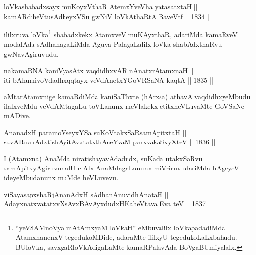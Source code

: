 
\begin{shl}
loVkashabadxsayx muKoyxV\s thaR AtemxYveVha yatasatxtaH || \\
kamARdiheVtusAdheyxVSu gwNiV loVkAthaRtA BaveVtf \hfill || 1834 ||  
\end{shl}

\begin{artha}
ililxruva loVka\footnote[1]{``yeVSAMnoV\s ya mAtAmxyaM loVkaH'' eMbuvalilx loVkapadadiMda
AtamxnanenxV tegedukoMDide, adaraMte ililxyU tegedukoLaLxbahudu. BUloVka, savxgaRloVkAdigaLaMte kamaRPalavAda BoVgaBUmiyalalx.} shabadxkekx AtamxveV muKAyxthaR, adariMda kamaRveV modalAda sAdhanagaLiMda Aguva PalagaLalilx loVka shabAdxthaRvu gwNavAgiruvudu.
\end{artha}


\begin{shl}
na\footnotemark[2] kamaRNA kaniVyasAtx vaqdidhxvAR nAnatxrAtamxnaH ||  \\
iti bAhumivoVdadhxqqtayx veVdAnetxYGoVRSaNA kaqtA \hfill || 1835 ||  
\end{shl}

\begin{artha}
aMtarAtamxnige kamaRdiMda kaniSaThxte (hArxsa) athavA vaqdidhxyeMbudu
ilalxveMdu veVdAMtagaLu toVLanunx meVlakekx etitxheVLuvaMte GoVSaNe
mADive.
\end{artha}


\begin{shl}
AnanadxH paramoV\s seyxYSa suKoVtakxSaRsamApitxtaH || \\
savARnanAdxtishAyitAvxtatxthAceYvaM parxvakaSxyXteV \hfill || 1836 ||  
\end{shl}

\begin{artha}
I (Atamxna) AnaMda niratishayavAdadudx, suKada utakxSaRvu
samApitxyAgiruvudalU elAlx AnaMdagaLanunx miVriruvudariMda hAgeyeV
ideyeMbudanunx muMde heVLuvevu.
\end{artha}

\begin{shl}
\footnotemark[1]viSayasapxshaRjAnanAdxH sAdhanAnuvidhAnataH || \\
AdayxnatxvatatxvXsAvxBAvAyxdudxHKaheVtava Eva teV \hfill || 1837 ||  
\end{shl}

